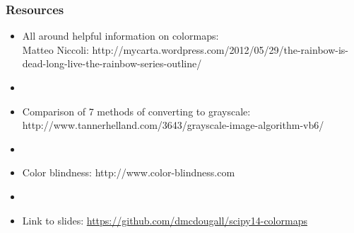\documentclass[ignorenonframetext]{beamer}
\begin{document}
\begin{frame}[c]\frametitle{Resources}
\begin{itemize}
    \item[] All around helpful information on colormaps: \\Matteo Niccoli: http://mycarta.wordpress.com/2012/05/29/the-rainbow-is-dead-long-live-the-rainbow-series-outline/
    \item[] ~
    \item[] Comparison of 7 methods of converting to grayscale: http://www.tannerhelland.com/3643/grayscale-image-algorithm-vb6/
    \item[] ~
    \item[] Color blindness: http://www.color-blindness.com
    \item[] ~
    \item[] Link to slides:  \url{https://github.com/dmcdougall/scipy14-colormaps}
\end{itemize}
\end{frame}
\end{document}
